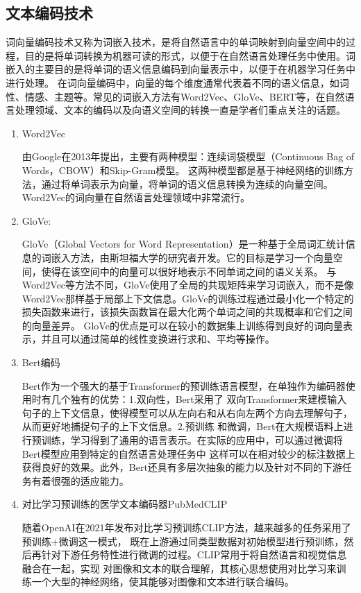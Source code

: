 \subsection{文本编码技术}
词向量编码技术又称为词嵌入技术，是将自然语言中的单词映射到向量空间中的过程，目的是将单词转换为机器可读的形式，以便于在自然语言处理任务中使用。词嵌入的主要目的是将单词的语义信息编码到向量表示中，以便于在机器学习任务中进行处理。
在词向量编码中，向量的每个维度通常代表着不同的语义信息，如词性、情感、主题等。常见的词嵌入方法有Word2Vec、GloVe、BERT等，在自然语言处理领域、文本的编码以及向语义空间的转换一直是学者们重点关注的话题。
\begin{enumerate}[topsep = 0 pt, itemsep= 0 pt, parsep=0pt, partopsep=0pt, leftmargin=44pt, itemindent=0pt, labelsep=6pt, label=(\arabic*)]
	\item Word2Vec
	
	由Google在2013年提出\cite{mikolov2013efficient,mikolov2013distributed}，主要有两种模型：连续词袋模型（Continuous Bag of Words，CBOW）和Skip-Gram模型。
	这两种模型都是基于神经网络的训练方法，通过将单词表示为向量，将单词的语义信息转换为连续的向量空间。Word2Vec的词向量在自然语言处理领域中非常流行。
	\item GloVe:
	
	GloVe（Global Vectors for Word Representation）是一种基于全局词汇统计信息的词嵌入方法\cite{pennington2014glove}，由斯坦福大学的研究者开发。它的目标是学习一个向量空间，使得在该空间中的向量可以很好地表示不同单词之间的语义关系。
	与Word2Vec等方法不同，GloVe使用了全局的共现矩阵来学习词嵌入，而不是像Word2Vec那样基于局部上下文信息。GloVe的训练过程通过最小化一个特定的损失函数来进行，该损失函数旨在最大化两个单词之间的共现概率和它们之间的向量差异。
	GloVe的优点是可以在较小的数据集上训练得到良好的词向量表示，并且可以通过简单的线性变换进行求和、平均等操作。
	\item Bert编码
	
	Bert作为一个强大的基于Transformer的预训练语言模型\cite{devlin2018bert}，在单独作为编码器使用时有几个独有的优势：1.双向性，Bert采用了
	双向Transformer来建模输入句子的上下文信息，使得模型可以从左向右和从右向左两个方向去理解句子，从而更好地捕捉句子的上下文信息。2.预训练
	和微调，Bert在大规模语料上进行预训练，学习得到了通用的语言表示。在实际的应用中，可以通过微调将Bert模型应用到特定的自然语言处理任务中
	这样可以在相对较少的标注数据上获得良好的效果。此外，Bert还具有多层次抽象的能力以及针对不同的下游任务有着很强的适应能力。
	\item 对比学习预训练的医学文本编码器PubMedCLIP
	
	随着OpenAI在2021年发布对比学习预训练CLIP方法，越来越多的任务采用了预训练+微调这一模式，
	既在上游通过同类型数据对初始模型进行预训练，然后再针对下游任务特性进行微调的过程。CLIP常用于将自然语言和视觉信息融合在一起，实现
	对图像和文本的联合理解，其核心思想使用对比学习来训练一个大型的神经网络，使其能够对图像和文本进行联合编码。
\end{enumerate}

